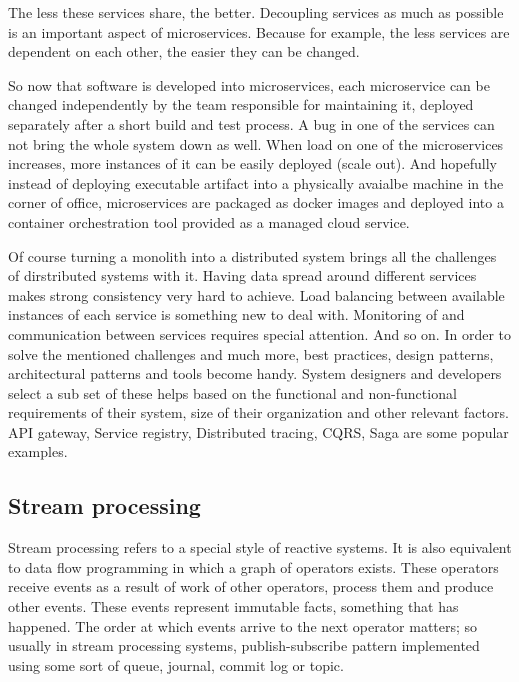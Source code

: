 \documentclass[a4]{report}
\begin{document}
    The less these services share, the better.
    Decoupling services as much as possible is an important aspect of microservices.
    Because for example, the less services are dependent on each other, the easier they can be changed.

    So now that software is developed into microservices, each microservice can be changed independently by the
    team responsible for maintaining it, deployed separately after a short build and test process.
    A bug in one of the services can not bring the whole system down as well.
    When load on one of the microservices increases, more instances of it can be easily deployed (scale out).
    And hopefully instead of deploying executable artifact into a physically avaialbe machine in the corner of
    office, microservices are packaged as docker images and deployed into a container orchestration tool provided as
    a managed cloud service.

    Of course turning a monolith into a distributed system brings all the challenges of dirstributed systems with it.
    Having data spread around different services makes strong consistency very hard to achieve.
    Load balancing between available instances of each service is something new to deal with.
    Monitoring of and communication between services requires special attention.
    And so on.
    In order to solve the mentioned challenges and much more, best practices, design patterns, architectural patterns
    and tools become handy.
    System designers and developers select a sub set of these helps based on the functional and non-functional
    requirements of their system, size of their organization and other relevant factors.
    API gateway, Service registry, Distributed tracing, CQRS, Saga are some popular examples.
    \cite{microservice-architecture} \cite{microservices-pitfalls} \cite{microservices}

    \subsection{Stream processing}
    Stream processing refers to a special style of reactive systems.
    It is also equivalent to data flow programming in which a graph of operators exists.
    These operators receive events as a result of work of other operators, process them and produce other events.
    These events represent immutable facts, something that has happened.
    The order at which events arrive to the next operator matters;
    so usually in stream processing systems, publish-subscribe pattern implemented using some sort of queue,
    journal, commit log or topic.
    \cite{flink} \cite{fast-data-archs}
\end{document}
